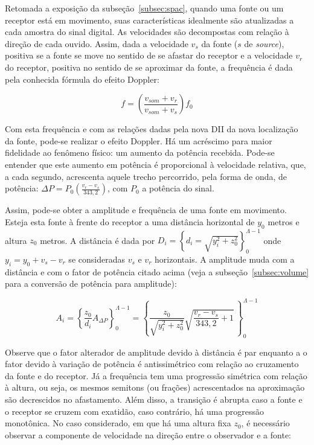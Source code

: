Retomada a exposição da subseção~\ref{subsec:spac}, quando uma fonte ou um receptor está em movimento, suas características idealmente são atualizadas a cada amostra do sinal digital. As velocidades são decompostas com relação à direção de cada ouvido. Assim, dada a velocidade $v_s$ da fonte ($s$ de \emph{source}), positiva se a fonte se move no sentido de se afastar do receptor e a velocidade $v_r$ do receptor, positiva no sentido de se aproximar da fonte, a frequência é dada pela conhecida fórmula do efeito Doppler:

\begin{equation}\label{eq:fDoppler}
    f=\left(\frac{v_{som}+v_r}{v_{som}+v_s}\right)f_0
\end{equation}

Com esta frequência e com as relações dadas pela nova DII da nova localização da fonte, pode-se realizar o efeito Doppler. Há um acréscimo para maior fidelidade ao fenômeno físico: um aumento da potência recebida. Pode-se entender que este aumento em potência é proporcional à velocidade relativa, que, a cada segundo, acrescenta aquele trecho percorrido, pela forma de onda, de potência: $\Delta P=P_0\left(\frac{v_r-v_s}{343,2}\right)$, com $P_0$ a potência do sinal.

Assim, pode-se obter a amplitude e frequência de uma fonte em movimento.
Esteja esta fonte à frente do receptor
a uma distância horizontal de $y_0$ metros e altura $z_0$ metros. A distância é dada por
$D_i=\left\{ d_i=\sqrt{ y_{i}^{2}+z_{0}^{2} } \right\}_0^{\Lambda-1}$
onde $y_i=y_0+v_s-v_r$ se consideradas $v_s$ e $v_r$ horizontais. A amplitude muda com a distância e com o fator de potência citado acima (veja a subseção~\ref{subsec:volume} para a conversão de potência para amplitude):

\begin{equation}\label{eq:aDoppler}
    A_i=\left\{ \frac{z_0}{d_i}A_{\Delta P}\right\}_0^{\Lambda-1} = \left\{ \frac{z_0}{\sqrt{y_i^2+z_0^2}} \sqrt{\frac{v_r-v_s}{343,2}+1}  \,\right\}_0^{\Lambda-1}
\end{equation}

Observe que o fator alterador de amplitude devido à distância é par enquanto a o fator devido à variação de potência é antissimétrico com relação ao cruzamento da fonte e do receptor. Já a frequência tem uma progressão simétrica com relação à altura, ou seja, os mesmos semitons (ou frações) acrescentados na aproximação são decrescidos no afastamento. Além disso, a transição é abrupta caso a fonte e o receptor se cruzem com exatidão, caso contrário, há uma progressão monotônica. No caso considerado, em que há uma altura fixa $z_0$, é necessário observar a componente de velocidade na direção entre o observador e a fonte:

